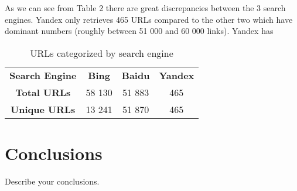 \documentclass{sig-alternate}
\begin{document}
As we can see from Table 2 there are great discrepancies between the 3 search engines. Yandex only retrieves 465 URLs compared to the other two which have dominant numbers (roughly between 51 000 and 60 000 links). Yandex has 

\begin{table}[h]
\centering
\begin{tabular}{|c|c|c|c|}
\hline
\rowcolor[HTML]{343434} 
{\color[HTML]{FFFFFF} \textbf{Search Engine}} & {\color[HTML]{FFFFFF} \textbf{Bing}} & {\color[HTML]{FFFFFF} \textbf{Baidu}} & {\color[HTML]{FFFFFF} \textbf{Yandex}} \\
\textbf{Total URLs}                           & 58 130                               & 51 883                                & 465                                    \\ \hline
\textbf{Unique URLs}                          & 13 241                               & 51 870                                 & 465                                  \\ \hline 
\end{tabular}
\caption{URLs categorized by search engine}
\end{table}



\section{Conclusions}
Describe your conclusions. 



%
%
\end{document}
